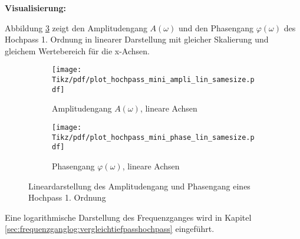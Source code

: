 \begin{frame}
{    \textbf{Visualisierung:}

    Abbildung \ref{plot:hochpass:mini:lin} zeigt den Amplitudengang $A(\omega)$ und den Phasengang $\varphi(\omega)$ des Hochpass 1. Ordnung in linearer Darstellung
    mit gleicher Skalierung und gleichem Wertebereich für die x-Achsen.

    \begin{figure}[h]\centering
        \begin{subfigure}{0.45\textwidth}\centering
            \texttt{[image: Tikz/pdf/plot\_hochpass\_mini\_ampli\_lin\_samesize.pdf]}
            \caption{Amplitudengang $A(\omega)$, lineare Achsen}
            \label{plot:hochpass:ampli:mini:lin}
        \end{subfigure}
        \begin{subfigure}{0.45\textwidth}\centering
        \texttt{[image: Tikz/pdf/plot\_hochpass\_mini\_phase\_lin\_samesize.pdf]}
            \caption{Phasengang $\varphi(\omega)$, lineare Achsen}
            \label{plot:hochpass:phase:mini:lin}
        \end{subfigure}
        \caption{Lineardarstellung des Amplitudengang und Phasengang eines Hochpass 1. Ordnung}
        \label{plot:hochpass:mini:lin}
    \end{figure}

    Eine logarithmische Darstellung des Frequenzganges wird in Kapitel \ref{sec:frequenzganglog:vergleichtiefpasshochpass} eingeführt.
}%
\end{frame}

            

